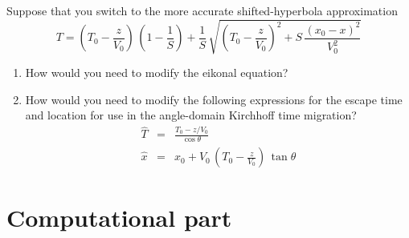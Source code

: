 \begin{enumerate}
Suppose that you switch to the more accurate shifted-hyperbola approximation
\begin{equation}
T = \left(T_0-\frac{z}{V_0}\right)\,(1-\frac{1}{S}) + \frac{1}{S}\,\sqrt{\left(T_0-\frac{z}{V_0}\right)^2 + S\,\frac{(x_0-x)^2}{V_0^2}}
\end{equation}

\begin{enumerate}
\item How would you need to modify the eikonal equation?
\item How would you need to modify the following expressions for the escape time and location for use in the angle-domain Kirchhoff time migration?
\begin{eqnarray}
\hat{T} & = & \frac{T_0-z/V_0}{\cos{\theta}} \\
\hat{x} & = & x_0 + V_0\,\left(T_0-\frac{z}{V_0}\right)\,\tan{\theta}
\end{eqnarray}

\end{enumerate}

\end{enumerate}

\newpage

\section{Computational part}

